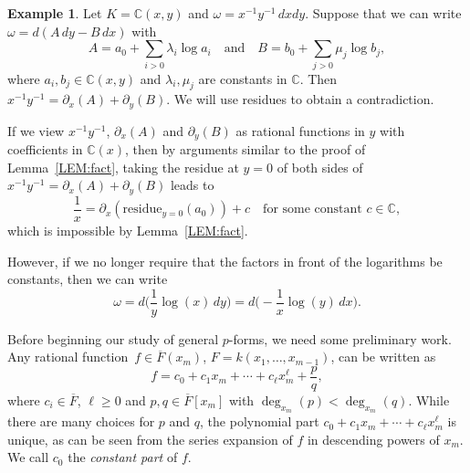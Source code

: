 \documentclass{amsart}
\theoremstyle{definition}
\newtheorem{example}[thm]{Example}
\def\bC{{\mathbb C}}
\numberwithin{equation}{section}
\numberwithin{thm}{section}
\begin{document}
\begin{example}
\label{EXAM:pform}
Let $K = \bC(x, y)$ and $\omega = x^{-1}y^{-1}\, dxdy$. Suppose that we can write $\omega = d(A \,dy - B \,dx)$ with
\[
A = a_0 + \sum_{i>0} \lambda_i \log a_i \quad \text{and}\quad B = b_0 + \sum_{j>0} \mu_j \log b_j,
\]
where $a_i, b_j \in \bC(x, y)$ and $\lambda_i, \mu_j$ are constants in $\bC$.  Then $x^{-1}y^{-1} = \partial_x(A) + \partial_y(B)$.  We will use residues to obtain a contradiction.  

If we view $x^{-1}y^{-1}$, $\partial_x(A)$ and $\partial_y(B)$ as rational functions in $y$ with coefficients in $\bC(x)$, then by arguments similar to the proof of Lemma~\ref{LEM:fact}, taking the residue at $y= 0$ of both sides of $x^{-1}y^{-1} = \partial_x(A) + \partial_y(B)$ leads to
\[
\frac{1}{x} =  \partial_x(\text{residue}_{y=0}(a_0)) + c \quad \text{for some constant $c\in \bC$},
\]
which is impossible by Lemma~\ref{LEM:fact}.  %

However, if we no longer require that the factors in front of the logarithms be constants, then we can write
\[
\omega = d\Big(\frac{1}{y}\log (x)\, dy\Big) = d\Big({-}\frac{1}{x}\log(y)\, dx\Big).
\]
\end{example}

Before beginning our study of general $p$-forms, we need some preliminary work.
Any rational function~$f\in \overline{F}(x_m)$, $F = k(x_1, \ldots, x_{m-1})$, can be written as
\begin{equation}
\label{EQ:constpart}
	f = c_0 +  c_1 x_m + \cdots + c_\ell x_m^\ell + \frac{p}{q},
\end{equation}
where $c_i \in \overline{F}$, $\ell \geq 0$ and $p ,q \in \overline{F}[x_m]$ with $\deg_{x_m}(p) < \deg_{x_m}(q)$.  While there are many choices for $p$ and $q$, the polynomial part $c_0 +  c_1 x_m + \cdots + c_\ell x_m^\ell$ is unique, as can be seen from the series expansion of $f$ in descending powers of $x_m$.
We call $c_0$  the \textit{constant part} of $f$. 
\end{document}
